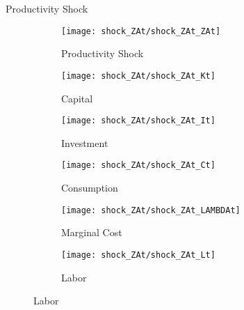 \documentclass[../quali_slides.tex]{subfiles}
\begin{document}
\begin{frame}{Productivity Shock}
	
	\begin{figure}[h!]
		\centering
		\begin{subfigure}[b]{0.3\textwidth}
			\centering
			\texttt{[image: shock\_ZAt/shock\_ZAt\_ZAt]}
			\caption{Productivity Shock}
			\label{fig:zat-productivity-shock}
		\end{subfigure}
		\hfill
		\begin{subfigure}[b]{0.3\textwidth}
			\centering
			\texttt{[image: shock\_ZAt/shock\_ZAt\_Kt]}
			\caption{Capital}
			\label{fig:zat-capital}
		\end{subfigure}
		\hfill
		\begin{subfigure}[b]{0.3\textwidth}
			\centering
			\texttt{[image: shock\_ZAt/shock\_ZAt\_It]}
			\caption{Investment}
			\label{fig:zat-investment}
		\end{subfigure}
		\hfill
		
		\vspace*{0.5cm}
		
		\begin{subfigure}[b]{0.3\textwidth}
			\centering
			\texttt{[image: shock\_ZAt/shock\_ZAt\_Ct]}
			\caption{Consumption}
			\label{fig:zat-consumption}
		\end{subfigure}
		\hfill
		\begin{subfigure}[b]{0.3\textwidth}
			\centering
			\texttt{[image: shock\_ZAt/shock\_ZAt\_LAMBDAt]}
			\caption{Marginal Cost}
			\label{fig:zat-marginal-cost}
		\end{subfigure}
		\hfill
		\begin{subfigure}[b]{0.3\textwidth}
			\centering
			\texttt{[image: shock\_ZAt/shock\_ZAt\_Lt]}
			\caption{Labor}
			\label{fig:zat-labor}
		\end{subfigure}
		\hfill		
	\end{figure}
	
\end{frame}

\end{document}
